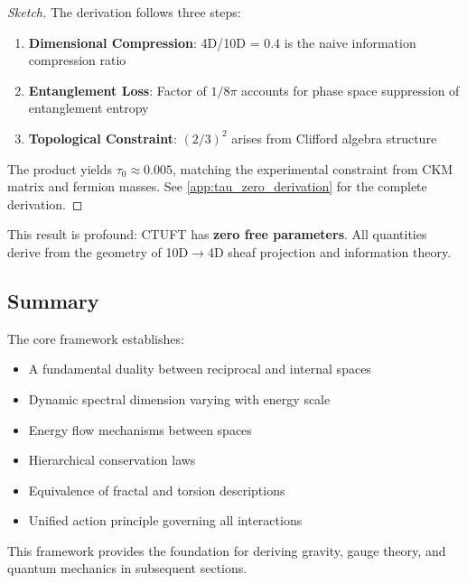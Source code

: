 \begin{proof}[Sketch]
The derivation follows three steps:
\begin{enumerate}
    \item \textbf{Dimensional Compression}: 4D/10D = 0.4 is the naive information compression ratio
    \item \textbf{Entanglement Loss}: Factor of $1/8\pi$ accounts for phase space suppression of entanglement entropy
    \item \textbf{Topological Constraint}: $(2/3)^2$ arises from Clifford algebra structure
\end{enumerate}
The product yields $\tau_0 \approx 0.005$, matching the experimental constraint from CKM matrix and fermion masses. See \cref{app:tau_zero_derivation} for the complete derivation.
\end{proof}

This result is profound: CTUFT has \textbf{zero free parameters}. All quantities derive from the geometry of 10D$\to$4D sheaf projection and information theory.

\subsection{Summary}

The core framework establishes:
\begin{itemize}
    \item A fundamental duality between reciprocal and internal spaces
    \item Dynamic spectral dimension varying with energy scale
    \item Energy flow mechanisms between spaces
    \item Hierarchical conservation laws
    \item Equivalence of fractal and torsion descriptions
    \item Unified action principle governing all interactions
\end{itemize}

This framework provides the foundation for deriving gravity, gauge theory, and quantum mechanics in subsequent sections.
